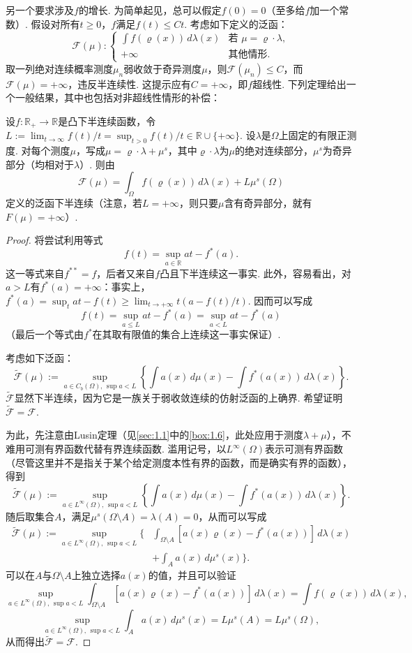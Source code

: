 另一个要求涉及$f$的增长. 为简单起见，总可以假定$f(0)=0$（至多给$f$加一个常数）. 假设对所有$t\geq0$，$f$满足$f(t)\leq Ct$. 考虑如下定义的泛函：
\[
 \mathscr F(\mu):\begin{cases}
 \displaystyle\int f(\varrho(x))\,d\lambda(x)&\text{若 }\mu=\varrho\cdot\lambda,\\
 +\infty&\text{其他情形}.
 \end{cases}
\]
取一列绝对连续概率测度$\mu_n$弱收敛于奇异测度$\mu$，则$\mathscr F(\mu_n)\leq C$，而$\mathscr F(\mu)=+\infty$，违反半连续性. 这提示应有$C=+\infty$，即$f$超线性. 下列定理给出一个一般结果，其中也包括对非超线性情形的补偿：
\begin{proposition}\label{obj:7.7}
设$f:\mathbb R_+\to\mathbb R$是凸下半连续函数，令$L:=\lim_{t\to\infty}f(t)/t=\sup_{t>0}f(t)/t\in\mathbb R\cup\{+\infty\}$. 设$\lambda$是$\Omega$上固定的有限正测度. 对每个测度$\mu$，写成$\mu=\varrho\cdot\lambda+\mu^s$，其中$\varrho\cdot\lambda$为$\mu$的绝对连续部分，$\mu^s$为奇异部分（均相对于$\lambda$）. 则由
\[
 \mathscr F(\mu)=\int_\Omega f(\varrho(x))\,d\lambda(x)+L\mu^s(\Omega)
\]
定义的泛函下半连续（注意，若$L=+\infty$，则只要$\mu$含有奇异部分，就有\mbox{$F(\mu)=+\infty$）.}
\end{proposition}
\begin{proof}
\label{idx:i90-p256}
将尝试利用等式
\[
 f(t)=\sup_{a\in\mathbb R}at-f^*(a).
\]
这一等式来自$f^{**}=f$，后者又来自$f$凸且下半连续这一事实. 此外，容易看出，对$a>L$有$f^*(a)=+\infty$：事实上，$f^*(a)=\sup_t at-f(t)\geq\lim_{t\to+\infty}t(a-f(t)/t)$. 因而可以写成
\[
 f(t)=\sup_{a\leq L}at-f^*(a)=\sup_{a<L}at-f^*(a)
\]
（最后一个等式由$f^*$在其取有限值的集合上连续这一事实保证）.

考虑如下泛函：
\[
 \widetilde{\mathscr F}(\mu):=
 \sup_{a\in C_b(\Omega),\,\sup a<L}
 \left\{\int a(x)\,d\mu(x)-\int f^*(a(x))\,d\lambda(x)\right\}.
\]
$\widetilde{\mathscr F}$显然下半连续，因为它是一族关于弱收敛连续的仿射泛函的上确界. 希望证明$\widetilde{\mathscr F}=\mathscr F$.

为此，先注意由Lusin定理（见\autoref{sec:1.1}中的\autoref{box:1.6}，此处应用于测度$\lambda+\mu$），不难用可测有界函数代替有界连续函数. 滥用记号，以$L^\infty(\Omega)$表示可测有界函数（尽管这里并不是指关于某个给定测度本性有界的函数，而是确实有界的函数），得到
\[
 \widetilde{\mathscr F}(\mu):=
 \sup_{a\in L^\infty(\Omega),\,\sup a<L}
 \left\{\int a(x)\,d\mu(x)-\int f^*(a(x))\,d\lambda(x)\right\}.
\]
随后取集合$A$，满足$\mu^s(\Omega\setminus A)=\lambda(A)=0$，从而可以写成
\[
\begin{aligned}
 \widetilde{\mathscr F}(\mu):=
 \sup_{a\in L^\infty(\Omega),\,\sup a<L}\biggl\{
 &\int_{\Omega\setminus A}[a(x)\varrho(x)-f^*(a(x))]\,d\lambda(x)\\
 &+\int_A a(x)\,d\mu^s(x)\biggr\}.
\end{aligned}
\]
可以在$A$与$\Omega\setminus A$上独立选择$a(x)$的值，并且可以验证
\[
 \sup_{a\in L^\infty(\Omega),\,\sup a<L}
 \int_{\Omega\setminus A}[a(x)\varrho(x)-f^*(a(x))]\,d\lambda(x)
 =\int f(\varrho(x))\,d\lambda(x),
\]
\[
 \sup_{a\in L^\infty(\Omega),\,\sup a<L}\int_Aa(x)\,d\mu^s(x)
       =L\mu^s(A)=L\mu^s(\Omega),
\]
从而得出$\widetilde{\mathscr F}=\mathscr F$.
\end{proof}
